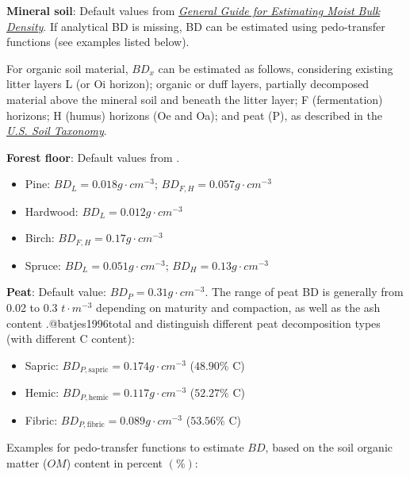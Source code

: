 \documentclass[10pt,b5paper,]{book}
\theoremstyle{definition}
\theoremstyle{definition}
\theoremstyle{definition}
\theoremstyle{remark}
\begin{document}
\textbf{Mineral soil}: Default values from
\href{https://www.nrcs.usda.gov/wps/portal/nrcs/detail/soils/survey/office/ssr10/tr/?cid=nrcs144p2_074844}{\emph{General
Guide for Estimating Moist Bulk Density}}. If analytical BD is missing,
BD can be estimated using pedo-transfer functions (see examples listed
below).

For organic soil material, \(BD_x\) can be estimated as follows,
considering existing litter layers L (or Oi horizon); organic or duff
layers, partially decomposed material above the mineral soil and beneath
the litter layer; F (fermentation) horizons; H (humus) horizons (Oe and
Oa); and peat (P), as described in the
\href{https://www.nrcs.usda.gov/Internet/FSE_DOCUMENTS/nrcs142p2_051232.pdf}{\emph{U.S.
Soil Taxonomy}}.

\textbf{Forest floor}: Default values from \citet{ottmar_litter_2007}.

\begin{itemize}
\item
  Pine: \(BD_{L} = 0.018 g \cdot cm^{-3}\);
  \(BD_{F,H} = 0.057 g \cdot cm^{-3}\)
\item
  Hardwood: \(BD_{L} = 0.012 g \cdot cm^{-3}\)
  \citep{barney_forest_1981}
\item
  Birch: \(BD_{F,H} = 0.17 g \cdot cm^{-3}\)
\item
  Spruce: \(BD_{L} = 0.051 g \cdot cm^{-3}\);
  \(BD_{H}= 0.13 g \cdot cm^{-3}\)
\end{itemize}

\textbf{Peat}: Default value: \(BD_{P} = 0.31 g \cdot cm^{-3}\). The
range of peat BD is generally from 0.02 to 0.3 \(t \cdot m^{-3}\)
depending on maturity and compaction, as well as the ash content
\citep{agus_measuring_2011}.@batjes1996total and
\citet{agus_measuring_2011} distinguish different peat decomposition
types (with different C content):

\begin{itemize}
\item
  Sapric: \(BD_{P,\text{sapric}} = 0.174 g \cdot cm^{-3}\) (\(48.90\%\)
  C)
\item
  Hemic: \(BD_{P,\text{hemic}} = 0.117 g \cdot cm^{-3}\) (\(52.27\%\) C)
\item
  Fibric: \(BD_{P,\text{fibric}} = 0.089 g \cdot cm^{-3}\) (\(53.56\%\)
  C)
\end{itemize}

Examples for pedo-transfer functions to estimate \(BD\), based on the
soil organic matter (\(OM\)) content in percent \((\%)\):
\end{document}
